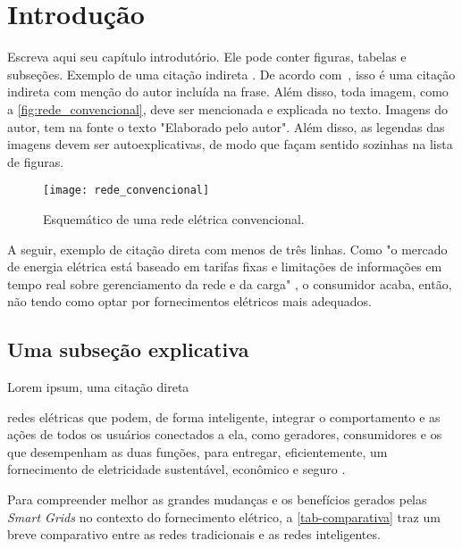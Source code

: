 \chapter[Introdução]{Introdução}
\label{ch:introdução}
Escreva aqui seu capítulo introdutório. 
Ele pode conter figuras, tabelas e subseções. Exemplo de uma citação indireta \cite{yu2011new}. De acordo com~, isso é uma citação indireta com menção do autor incluída na frase. Além disso, toda imagem, como a \autoref{fig:rede_convencional}, deve ser mencionada e explicada no texto. Imagens do autor, tem na fonte o texto "Elaborado pelo autor". Além disso, as legendas das imagens devem ser autoexplicativas, de modo que façam sentido sozinhas na lista de figuras.

\begin{figure}[h!]
	\texttt{[image: rede\_convencional]}
	\centering
	\caption[Esquemático de uma rede elétrica convencional.]{Esquemático de uma rede elétrica convencional.}
	\label{fig:rede_convencional}
\end{figure}
\FloatBarrier

A seguir, exemplo de citação direta com menos de três linhas. Como "o mercado de energia elétrica está baseado em tarifas fixas e limitações de informações em tempo real sobre gerenciamento da rede e da carga" \cite[p. 15]{cgee}, o consumidor acaba, então, não tendo como optar por fornecimentos elétricos mais adequados. 


\section{Uma subseção explicativa}

Lorem ipsum, uma citação direta 

\begin{citacao}[brazil]
[...] redes elétricas que podem, de forma inteligente, integrar o comportamento e as ações de todos os usuários conectados a ela, como geradores, consumidores e os que desempenham as duas funções, para entregar, eficientemente, um fornecimento de eletricidade sustentável, econômico e seguro \cite[p. 51, tradução livre]{yu2011new}.
\end{citacao}

Para compreender melhor as grandes mudanças e os benefícios gerados pelas \textit{Smart Grids} no contexto do fornecimento elétrico, a \autoref{tab-comparativa} traz um breve comparativo entre as redes tradicionais e as redes inteligentes.

